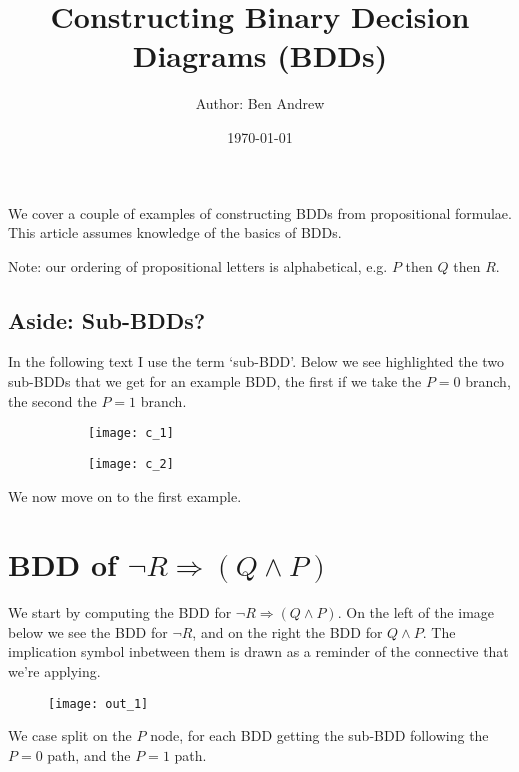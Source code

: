 \documentclass[11pt]{article}
\title{\textbf{Constructing Binary Decision Diagrams (BDDs)}}
\author{Author: Ben Andrew}
\date{\today}
\begin{document}
\maketitle

% 


We cover a couple of examples of constructing BDDs from propositional formulae. This article assumes knowledge of the basics of BDDs.

Note: our ordering of propositional letters is alphabetical, e.g. $P$ then $Q$ then $R$.

\subsection{Aside: Sub-BDDs?}

In the following text I use the term `sub-BDD'. Below we see highlighted the two sub-BDDs that we get for an example BDD, the first if we take the $P=0$ branch, the second the $P=1$ branch.

\begin{figure}[H]
  \centering
  \begin{subfigure}{0.49\textwidth}
    \centering
    \texttt{[image: c\_1]}
  \end{subfigure}
  \begin{subfigure}{0.49\textwidth}
    \centering
    \texttt{[image: c\_2]}
  \end{subfigure}
\end{figure}

We now move on to the first example.

\section{BDD of $\neg R \Rightarrow (Q \wedge P)$}

We start by computing the BDD for $\neg R \Rightarrow (Q \wedge P)$. On the left of the image below we see the BDD for $\neg R$, and on the right the BDD for $Q \wedge P$. The implication symbol inbetween them is drawn as a reminder of the connective that we're applying.

\begin{figure}[H]
	\centering
	\texttt{[image: out\_1]}
\end{figure}

We case split on the $P$ node, for each BDD getting the sub-BDD following the $P=0$ path, and the $P=1$ path.
\end{document}
